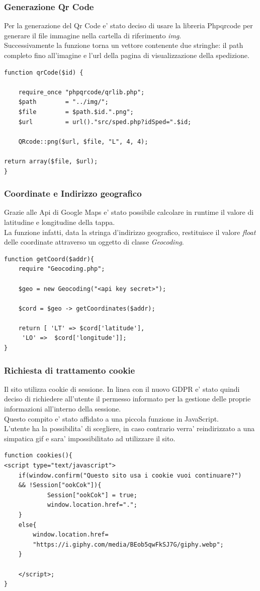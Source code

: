 \documentclass[a4paper, 12pt]{report}
\begin{document}
\subsubsection{Generazione Qr Code}
Per la generazione del Qr Code e' stato deciso di usare la libreria Phpqrcode per generare il file immagine nella cartella di riferimento \textit{img}.
\\Successivamente la funzione torna un vettore contenente due stringhe: il path completo fino all'imagine e l'url della pagina di visualizzazione della 
spedizione.
\begin{lstlisting}[caption=\textit{getQrCode()}]
function qrCode($id) {

    require_once "phpqrcode/qrlib.php";
    $path        = "../img/";
    $file        = $path.$id.".png";
    $url         = url()."src/sped.php?idSped=".$id;

    QRcode::png($url, $file, "L", 4, 4); 

return array($file, $url);
}
\end{lstlisting}
\subsubsection{Coordinate e Indirizzo geografico}
Grazie alle Api di Google Maps e' stato possibile calcolare in runtime il valore 
di latitudine e longitudine della tappa.\\ 
La funzione infatti, data la stringa d'indirizzo geografico, restituisce il valore \textit{float} delle coordinate attraverso un oggetto di classe \textit{Geocoding}.
\begin{lstlisting}[caption=\textit{getCoord()}]
function getCoord($addr){
    require "Geocoding.php";
    
    $geo = new Geocoding("<api key secret>");

    $cord = $geo -> getCoordinates($addr);

    return [ 'LT' => $cord['latitude'],
     'LO' =>  $cord['longitude']];
}
\end{lstlisting}
\subsubsection{Richiesta di trattamento cookie}
Il sito utilizza cookie di sessione. In linea con il nuovo GDPR e' stato quindi deciso di richiedere all'utente il permesso informato per la gestione 
delle proprie informazioni all'interno della sessione. \\
Questo compito e' stato affidato a una piccola funzione in JavaScript.\\
L'utente ha la possibilita' di scegliere, in caso contrario verra' reindirizzato a una simpatica gif e sara' impossibilitato ad utilizzare il sito.
\begin{lstlisting}[caption=\textit{cookies()}]
function cookies(){
<script type="text/javascript">	
    if(window.confirm("Questo sito usa i cookie vuoi continuare?") 
    && !Session["ookCok"]){
            Session["ookCok"] = true;
            window.location.href=".";
    }
    else{
        window.location.href=
        "https://i.giphy.com/media/BEob5qwFkSJ7G/giphy.webp";
    }
                
    </script>;
}
\end{lstlisting}
\end{document}
